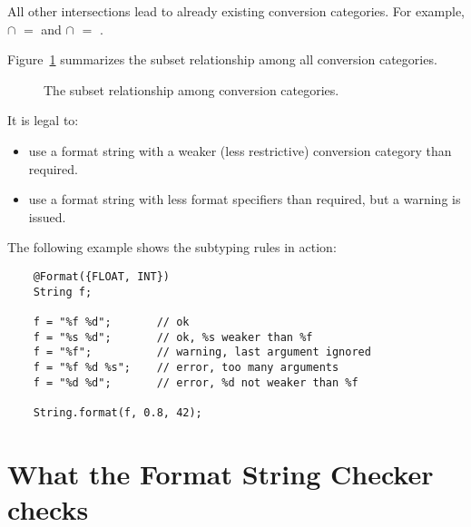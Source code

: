 \noindent All other intersections lead to already existing conversion categories.
For example,  $\cap$  $=$  and 
 $\cap$  $=$ .

Figure~\ref{fig:formatter-cat} summarizes the subset 
relationship among all conversion categories.

\begin{figure}[thbp]
    \caption{The subset relationship among conversion categories.}
    \label{fig:formatter-cat}
\end{figure}



% 

It is legal to:

\begin{itemize}
\item use a format string with a weaker (less restrictive) conversion category than required.
\item use a format string with less format specifiers than required, but a warning is issued. 
\end{itemize}

The following example shows the subtyping rules in action:

\begin{Verbatim}
    @Format({FLOAT, INT}) 
    String f;

    f = "%f %d";       // ok
    f = "%s %d";       // ok, %s weaker than %f
    f = "%f";          // warning, last argument ignored
    f = "%f %d %s";    // error, too many arguments
    f = "%d %d";       // error, %d not weaker than %f

    String.format(f, 0.8, 42);
\end{Verbatim}

\section{What the Format String Checker checks\label{formatter-guarantees}}

